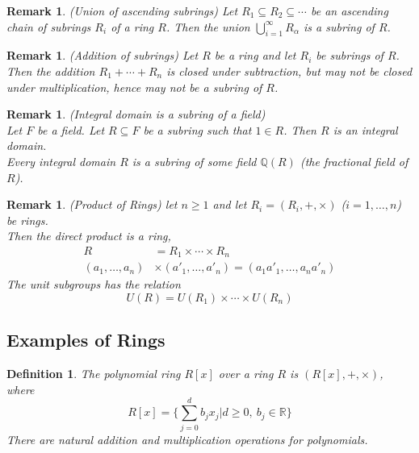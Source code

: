\documentclass[a4paper,8pt]{article}
\theoremstyle{theorem}
\newtheorem{definition}[theorem]{Definition}
\newtheorem{remark}[theorem]{Remark}
\begin{document}
\begin{remark}
\textit{{\color{blue} (Union of ascending subrings)}} Let $R_1 \subseteq R_2 \subseteq \cdots $ be an ascending chain of subrings $R_i$ of a ring $R$.
Then the union $\bigcup\limits_{i=1}^{\infty} R_\alpha$ is a subring of $R$.\\
\end{remark}


\begin{remark}
\textit{{\color{blue} (Addition of subrings)}} Let $R$ be a ring and let $R_i$ be subrings of $R$.\\
Then the addition $R_1 + \cdots + R_n$ is closed under subtraction, but may not be closed under multiplication, hence may not be a subring of $R$.\\
\end{remark}


\begin{remark}
\textit{{\color{blue} (Integral domain is a subring of a field)}}\\
Let $F$ be a field. Let $R \subseteq F$ be a subring such that $1 \in R$. Then $R$ is an integral domain.\\
Every integral domain $R$ is a subring of some field $\mathbb{Q}(R)$ (the fractional field of $R$).\\
\end{remark}


\begin{remark}
\textit{{\color{blue} (Product of Rings)}} let $n \geq 1$ and let $R_i = (R_i, +, \times)$ ($i=1, \ldots, n$) be rings.\\
Then the direct product is a ring, 
\begin{align}
R &= R_1 \times \cdots \times R_n \nonumber \\
(a_1, \ldots, a_n) &\times (a'_1, \ldots, a'_n) = (a_1 a'_1, \ldots, a_n a'_n) \nonumber
\end{align}
The unit subgroups has the relation 
\begin{equation}
U(R) = U(R_1)\times \cdots \times U(R_n) \nonumber
\end{equation}
\end{remark}


\subsection{Examples of Rings}

\begin{definition}
The \textit{{\color{blue} polynomial ring $R[x]$ over a ring $R$}} is $(R[x], +, \times)$,  where 
\begin{equation}
R[x] = \{\sum_{j=0}^{d} b_j x_j | d \geq 0, \ b_j \in \mathbb{R} \} \nonumber
\end{equation}
There are natural addition and multiplication operations for polynomials.\\
\end{definition}
\end{document}
